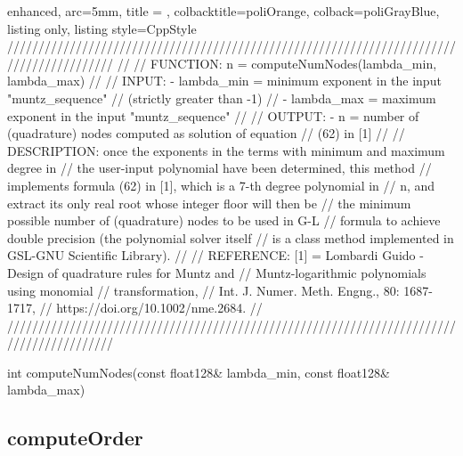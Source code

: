 \documentclass[a4paper, twosided]{book}
\begin{document}
\begin{tcblisting}{enhanced,
                   arc=5mm,
                   title = \color{black}{\large \ttfamily MonMap.cpp/computeNumNodes},
                   colbacktitle=poliOrange,
                   colback=poliGrayBlue,
                   listing only,
                   listing style=CppStyle}
/////////////////////////////////////////////////////////////////////////////////////////
//
//       FUNCTION: n = computeNumNodes(lambda_min, lambda_max)
//                
//          INPUT: - lambda_min = minimum exponent in the input "muntz_sequence" 
//                   (strictly greater than -1)
//                 - lambda_max = maximum exponent in the input "muntz_sequence"
//
//         OUTPUT: - n = number of (quadrature) nodes computed as solution of equation
//                      (62) in [1]
//
//    DESCRIPTION: once the exponents in the terms with minimum and maximum degree in
//                 the user-input polynomial have been determined, this method 
//                 implements formula (62) in [1], which is a 7-th degree polynomial in
//                 n, and extract its only real root whose integer floor will then be 
//                 the minimum possible number of (quadrature) nodes to be used in G-L
//                 formula to achieve double precision (the polynomial solver itself
//                 is a class method implemented in GSL-GNU Scientific Library).
//
//      REFERENCE: [1] = Lombardi Guido - Design of quadrature rules for Muntz and 
//                                        Muntz-logarithmic polynomials using monomial
//                                        transformation,
//                                        Int. J. Numer. Meth. Engng., 80: 1687-1717,
//                                        https://doi.org/10.1002/nme.2684.
//
/////////////////////////////////////////////////////////////////////////////////////////

int computeNumNodes(const float128& lambda_min, const float128& lambda_max)
\end{tcblisting}

\newpage
\subsection[computeOrder]{\changefont computeOrder}\label{SubSec4.1.4}
\end{document}
